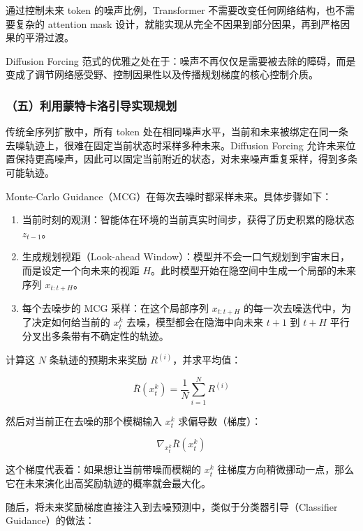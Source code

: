 通过控制未来 token 的噪声比例，Transformer 不需要改变任何网络结构，也不需要复杂的 attention mask 设计，就能实现从完全不因果到部分因果，再到严格因果的平滑过渡。

Diffusion Forcing 范式的优雅之处在于：噪声不再仅仅是需要被去除的障碍，而是变成了调节网络感受野、控制因果性以及传播规划梯度的核心控制介质。

\hypertarget{ux4e94ux5229ux7528ux8499ux7279ux5361ux6d1bux5f15ux5bfcux5b9eux73b0ux89c4ux5212}{%
\subsubsection{（五）利用蒙特卡洛引导实现规划}\label{ux4e94ux5229ux7528ux8499ux7279ux5361ux6d1bux5f15ux5bfcux5b9eux73b0ux89c4ux5212}}

传统全序列扩散中，所有 token 处在相同噪声水平，当前和未来被绑定在同一条去噪轨迹上，很难在固定当前状态时采样多种未来。Diffusion Forcing 允许未来位置保持更高噪声，因此可以固定当前附近的状态，对未来噪声重复采样，得到多条可能轨迹。

Monte-Carlo Guidance（MCG）在每次去噪时都采样未来。具体步骤如下：

\begin{enumerate}
\def\labelenumi{\arabic{enumi}.}
\tightlist
\item
  当前时刻的观测：智能体在环境的当前真实时间步，获得了历史积累的隐状态 \(z_{t-1}\)。
\item
  生成规划视距（Look-ahead Window）：模型并不会一口气规划到宇宙末日，而是设定一个向未来的视距 \(H\)。此时模型开始在隐空间中生成一个局部的未来序列 \(x_{t:t+H}\)。
\item
  每个去噪步的 MCG 采样：在这个局部序列 \(x_{t:t+H}\) 的每一次去噪迭代中，为了决定如何给当前的 \(x_t^k\) 去噪，模型都会在隐海中向未来 \(t+1\) 到 \(t+H\) 平行分叉出多条带有不确定性的轨迹。
\end{enumerate}

计算这 \(N\) 条轨迹的预期未来奖励 \(R^{(i)}\)，并求平均值：

\[
\bar{R}(x_t^k)=\frac{1}{N}\sum_{i=1}^N R^{(i)}
\]

然后对当前正在去噪的那个模糊输入 \(x_t^k\) 求偏导数（梯度）：

\[
\nabla_{x_t^k}\bar{R}(x_t^k)
\]

这个梯度代表着：如果想让当前带噪而模糊的 \(x_t^k\) 往梯度方向稍微挪动一点，那么它在未来演化出高奖励轨迹的概率就会最大化。

随后，将未来奖励梯度直接注入到去噪预测中，类似于分类器引导（Classifier Guidance）的做法：

